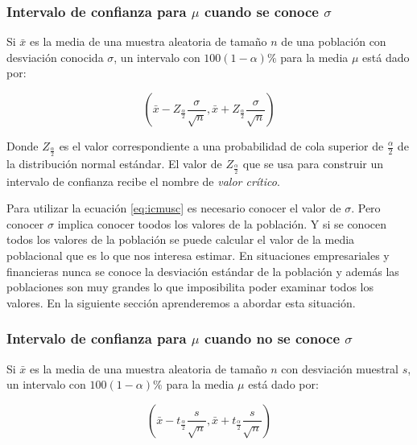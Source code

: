 \documentclass[]{book}
\begin{document}
\subsubsection{\texorpdfstring{Intervalo de confianza para \(\mu\)
cuando se conoce
\(\sigma\)}{Intervalo de confianza para \textbackslash{}mu cuando se conoce \textbackslash{}sigma}}\label{jt}

Si \(\bar{x}\) es la media de una muestra aleatoria de tamaño \(n\) de
una población con desviación conocida \(\sigma\), un intervalo con
\(100\left(1-\alpha\right)\%\) para la media \(\mu\) está dado por:

\begin{equation} 
  \left(\bar{x} - Z_{\frac{\alpha}{2}}\dfrac{\sigma}{\sqrt{n}}, \bar{x} + Z_{\frac{\alpha}{2}}\dfrac{\sigma}{\sqrt{n}}  \right)
  \label{eq:icmusc}
\end{equation}

Donde \(Z_{\frac{\alpha}{2}}\) es el valor correspondiente a una
probabilidad de cola superior de \(\frac{\alpha}{2}\) de la distribución
normal estándar. El valor de \(Z_{\frac{\alpha}{2}}\) que se usa para
construir un intervalo de confianza recibe el nombre de \emph{valor
crítico}.

Para utilizar la ecuación \eqref{eq:icmusc} es necesario conocer el valor
de \(\sigma\). Pero conocer \(\sigma\) implica conocer toodos los
valores de la población. Y si se conocen todos los valores de la
población se puede calcular el valor de la media poblacional que es lo
que nos interesa estimar. En situaciones empresariales y financieras
nunca se conoce la desviación estándar de la población y además las
poblaciones son muy grandes lo que imposibilita poder examinar todos los
valores. En la siguiente sección aprenderemos a abordar esta situación.

\subsubsection{\texorpdfstring{Intervalo de confianza para \(\mu\)
cuando no se conoce
\(\sigma\)}{Intervalo de confianza para \textbackslash{}mu cuando no se conoce \textbackslash{}sigma}}\label{icsd}

Si \(\bar{x}\) es la media de una muestra aleatoria de tamaño \(n\) con
desviación muestral \(s\), un intervalo con
\(100\left(1-\alpha\right)\%\) para la media \(\mu\) está dado por:

\begin{equation} 
  \left(\bar{x} - t_{\frac{\alpha}{2}}\dfrac{s}{\sqrt{n}}, \bar{x} + t_{\frac{\alpha}{2}}\dfrac{s}{\sqrt{n}}  \right)
  \label{eq:icmusd}
\end{equation}
\end{document}
